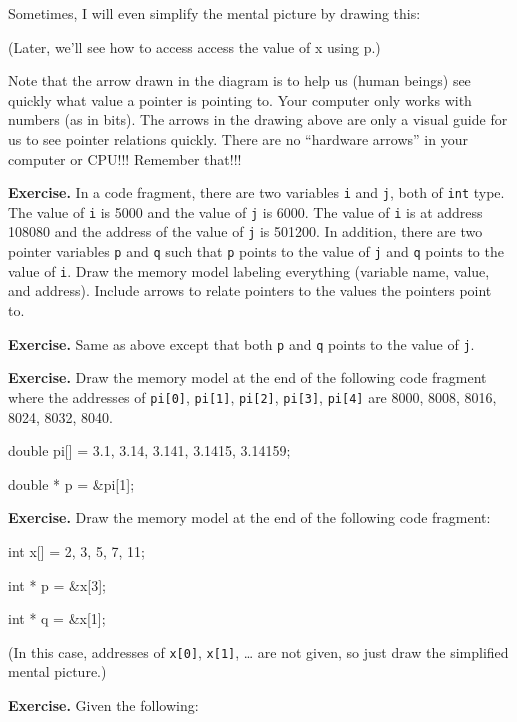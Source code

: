 \begin{ex}
Sometimes, I will even simplify the mental picture by drawing this:

(Later, we'll see how to access access the value of x using p.)

Note that the arrow drawn in the diagram is to help us (human beings)
see quickly what value a pointer is pointing to. Your computer only
works with numbers (as in bits). The arrows in the drawing above are
only a visual guide for us to see pointer relations quickly. There are
no ``hardware arrows'' in your computer or CPU!!! Remember that!!!

\textbf{Exercise. }In a code fragment, there are two variables \texttt{i}
and \texttt{j}, both of \texttt{int} type. The value of \texttt{i} is 5000 and
the value of \texttt{j} is 6000. The value of \texttt{i} is at address
108080 and the address of the value of \texttt{j} is 501200. In addition,
there are two pointer variables \texttt{p} and \texttt{q} such that \texttt{p}
points to the value of \texttt{j} and \texttt{q} points to the value of
\texttt{i}. Draw the memory model labeling everything (variable name,
value, and address). Include arrows to relate pointers to the values the
pointers point to.

\textbf{Exercise. }Same as above except that both \texttt{p} and \texttt{q}
points to the value of \texttt{j}.

\textbf{Exercise.} Draw the memory model at the end of the following
code fragment where the addresses of \texttt{pi[0]}, \texttt{pi[1]},
\texttt{pi[2]}, \texttt{pi[3]}, \texttt{pi[4]} are 8000, 8008,
8016, 8024, 8032, 8040.

\begin{consolethree}[escapeinside=||]

double pi[] = {3.1, 3.14, 3.141, 3.1415, 3.14159};

double * p = \&pi[1];
\end{consolethree}
\textbf{Exercise.} Draw the memory model at the end of the following
code fragment:

\begin{consolethree}[escapeinside=||]

int x[] = {2, 3, 5, 7, 11};

int * p = \&x[3];

int * q = \&x[1];
\end{consolethree}
(In this case, addresses of \texttt{x[0]}, \texttt{x[1]}, \ldots{}
are not given, so just draw the simplified mental picture.)

\textbf{Exercise.} Given the following:


\end{ex}
